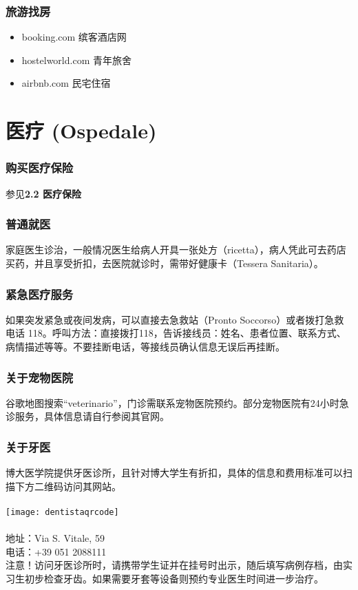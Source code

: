 \subsubsection{旅游找房}
\begin{itemize}
\item booking.com 缤客酒店网
\item hostelworld.com 青年旅舍
\item airbnb.com 民宅住宿
\end{itemize} 


\section{医疗 (Ospedale)}


\subsubsection{购买医疗保险}
参见\textbf{2.2 医疗保险} 

\subsubsection{普通就医}
家庭医生诊治，一般情况医生给病人开具一张处方（ricetta），病人凭此可去药店买药，并且享受折扣，去医院就诊时，需带好健康卡（Tessera Sanitaria）。
\subsubsection{紧急医疗服务}

如果突发紧急或夜间发病，可以直接去急救站（Pronto Soccorso）或者拨打急救电话 118。呼叫方法：直接拨打118，告诉接线员：姓名、患者位置、联系方式、病情描述等等。不要挂断电话，等接线员确认信息无误后再挂断。
\subsubsection{关于宠物医院}
谷歌地图搜索“veterinario”，门诊需联系宠物医院预约。部分宠物医院有24小时急诊服务，具体信息请自行参阅其官网。
\\
\subsubsection{关于牙医}
博大医学院提供牙医诊所，且针对博大学生有折扣，具体的信息和费用标准可以扫描下方二维码访问其网站。\\
\\
\texttt{[image: dentistaqrcode]}\\
\\
地址：Via S. Vitale, 59\\
电话：+39 051 2088111\\
注意！访问牙医诊所时，请携带学生证并在挂号时出示，随后填写病例存档，由实习生初步检查牙齿。如果需要牙套等设备则预约专业医生时间进一步治疗。

